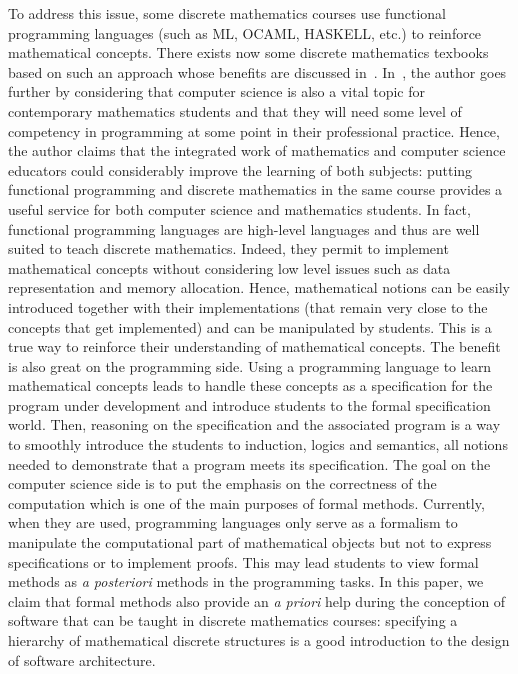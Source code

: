 \documentclass[submission,copyright,creativecommons]{eptcs}
\begin{document}
To address this issue, some discrete mathematics courses 
use functional programming languages (such as ML, OCAML, HASKELL, etc.)  to reinforce mathematical concepts.
There exists now some discrete mathematics
texbooks~\cite{Doets04,books/daglib/0007497,bookvandrunen} based on
such an approach whose
benefits are discussed 
in~\cite{DBLP:conf/sigcse/Wainwright92,oai:CiteSeerXPSU:10.1.1.19.3780,darosa02,Henderson02,DBLP:conf/oopsla/VanDrunen11}.
In~\cite{DBLP:conf/oopsla/VanDrunen11}, the author goes further 
by considering that computer science is also a vital topic for
contemporary mathematics students and that they will 
need some level of competency in programming at some point in their
professional practice. Hence, the author claims
that the
integrated work of mathematics and
computer science educators could considerably improve the learning of
both subjects: putting functional programming and
discrete mathematics in the same course provides a useful service for
both computer science and mathematics students. In fact,
functional programming languages are high-level languages
and thus are well suited to teach discrete
mathematics. Indeed, 
they permit to implement mathematical concepts without considering low level
issues such as data representation and memory allocation. Hence, 
mathematical notions can be easily introduced together with their 
implementations (that remain very
close to the concepts that get implemented) and can be manipulated
by students.
This is  a true way to reinforce
their understanding of mathematical concepts.
The benefit is also great  on the programming side. Using a
programming language to learn mathematical concepts leads to handle
these concepts as a specification for the program under development
and introduce students to the formal specification world. Then,
reasoning on the specification and the associated program is a way to smoothly
introduce the students to induction, logics and semantics, all notions
needed to demonstrate that a program meets its specification.
The goal on the computer science
side
is to put the emphasis on the correctness of the  computation
which is one of the main purposes of formal methods.
Currently, when they are used,  programming languages only serve
as a formalism to manipulate
the computational part of mathematical objects but not to express specifications or to
implement proofs. 
This may lead students to view formal methods as {\it a posteriori}  methods in the
programming tasks. In this paper, we claim that formal methods also provide 
an {\it a priori} help during the conception of software
that can be
taught in discrete mathematics courses: 
specifying a hierarchy of mathematical
discrete structures is a good introduction to the design of software architecture.
\end{document}
